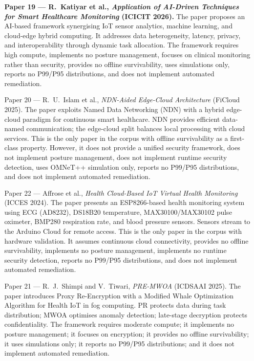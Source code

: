\textbf{Paper 19 --- R.~Katiyar et al., \textit{Application of AI-Driven Techniques for Smart Healthcare Monitoring} (ICICIT 2026).} The paper proposes an AI-based framework synergising IoT sensor analytics, machine learning, and cloud-edge hybrid computing. It addresses data heterogeneity, latency, privacy, and interoperability through dynamic task allocation. The framework requires high compute, implements no posture management, focuses on clinical monitoring rather than security, provides no offline survivability, uses simulations only, reports no P99/P95 distributions, and does not implement automated remediation.

{Paper 20 --- R.~U.~Islam et al., \textit{NDN-Aided Edge-Cloud Architecture} (FiCloud 2025).} The paper exploits Named Data Networking (NDN) with a hybrid edge-cloud paradigm for continuous smart healthcare. NDN provides efficient data-named communication; the edge-cloud split balances local processing with cloud services. This is the only paper in the corpus with offline survivability as a first-class property. However, it does not provide a unified security framework, does not implement posture management, does not implement runtime security detection, uses OMNeT++ simulation only, reports no P99/P95 distributions, and does not implement automated remediation.

{Paper 22 --- Affrose et al., \textit{Health Cloud-Based IoT Virtual Health Monitoring} (ICCES 2024).} The paper presents an ESP8266-based health monitoring system using ECG (AD8232), DS18B20 temperature, MAX30100/MAX30102 pulse oximeter, BMP280 respiration rate, and blood pressure sensors. Sensors stream to the Arduino Cloud for remote access. This is the only paper in the corpus with hardware validation. It assumes continuous cloud connectivity, provides no offline survivability, implements no posture management, implements no runtime security detection, reports no P99/P95 distributions, and does not implement automated remediation.

{Paper 21 --- R.~J.~Shimpi and V.~Tiwari, \textit{PRE-MWOA} (ICDSAAI 2025).} The paper introduces Proxy Re-Encryption with a Modified Whale Optimization Algorithm for Health IoT in fog computing. PR protects data during task distribution; MWOA optimises anomaly detection; late-stage decryption protects confidentiality. The framework requires moderate compute; it implements no posture management; it focuses on encryption; it provides no offline survivability; it uses simulations only; it reports no P99/P95 distributions; and it does not implement automated remediation.

